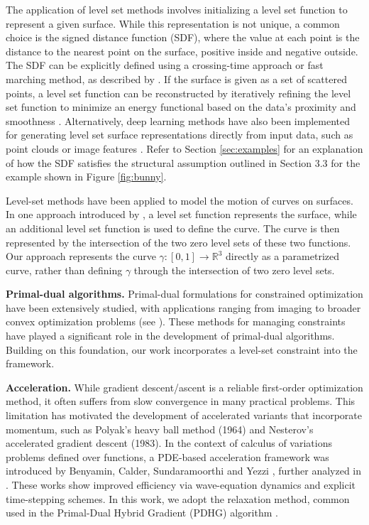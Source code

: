 \documentclass[12pt]{amsart}
\newcommand{\R}{\mathbb{R}}
\theoremstyle{definition}
\theoremstyle{remark}
\numberwithin{equation}{section}
\numberwithin{equation}{section}
\begin{document}
The application of level set methods involves initializing a level set function to represent a given surface. While this representation is not unique, a common choice is the signed distance function (SDF), where the value at each point is the distance to the nearest point on the surface, positive inside and negative outside.  
The SDF can be explicitly defined using a crossing-time approach or fast marching method, as described by \cite{Osher:2003a}. 
If the surface is given as a set of scattered points, a level set function can be reconstructed by iteratively refining the level set function to minimize an energy functional based on the data's proximity and smoothness \cite{Zhao:2001}. Alternatively, deep learning methods have also been implemented for generating level set surface representations directly from input data, such as point clouds or image features \cite{Park:2019}. Refer to Section \ref{sec:examples} for an explanation of how the SDF satisfies the structural assumption outlined in Section 3.3 for the example shown in Figure \ref{fig:bunny}. 

Level-set methods have been applied to model the motion of curves on surfaces. In one approach introduced by \cite{Cheng:2002}, a level set function represents the surface, while an additional  level set function is
used to define the curve.  The curve is then represented by the intersection of the two zero level sets of these two functions. 
Our approach represents the curve $\gamma: [0,1]\to \R^3$ directly as a parametrized curve, rather than defining $\gamma$ through the intersection of two zero level sets.

{\bf Primal-dual algorithms.} Primal-dual formulations for constrained optimization have been extensively studied,  with applications ranging from imaging to broader convex optimization problems (see \cite{Rockafellar:1970, Goldstein:2009, Esser:2010, Chambolle:2011, Boyd:2010}). These methods for managing constraints have played a significant role in the development of primal-dual algorithms. Building on this foundation, our work incorporates a level-set constraint into the framework.


{\bf Acceleration.} While gradient descent/ascent is a reliable first-order optimization method, it often suffers from slow convergence in many practical problems. This limitation  has motivated  the development of accelerated variants that incorporate momentum, such as  Polyak's heavy ball method (1964) and Nesterov’s accelerated gradient descent (1983). In the context of calculus of variations problems defined over functions, a PDE-based acceleration framework was introduced by Benyamin, Calder, Sundaramoorthi and Yezzi \cite{BCS2020}, further analyzed in \cite{CY2019}. These works show improved efficiency via wave-equation dynamics and explicit time-stepping schemes. In this work, we adopt the relaxation method, common used in the Primal-Dual Hybrid Gradient (PDHG) algorithm \cite{Chambolle:2011,Go2015}.
\end{document}
